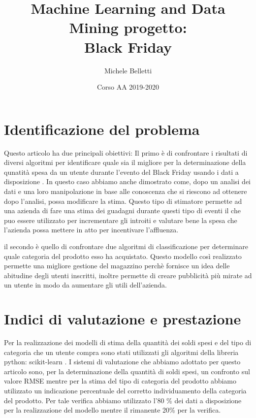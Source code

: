 \documentclass{article}
\title{Machine Learning and Data Mining progetto:\\Black Friday}
\author{Michele Belletti}
\date{Corso AA 2019-2020}
\begin{document}
\maketitle



\section{Identificazione del problema}
Questo articolo ha due principali obiettivi:
Il primo è di confrontare  i risultati di diversi algoritmi per identificare quale sia il migliore per la determinazione della qunatità spesa da un utente durante l'evento del Black Friday usando i dati a disposizione \cite{data} . In questo caso abbiamo anche dimostrato come, dopo un analisi dei dati e una loro manipolazione in base alle conoscenza che si riescono ad ottenere dopo l'analisi, possa modificare la stima.
Questo tipo di stimatore permette ad una azienda di fare una stima dei guadagni durante questi tipo di eventi il che puo essere utilizzato per incrementare gli introiti e valutare bene la spesa che l'azienda possa mettere in atto per incentivare l'affluenza.

il secondo è quello di confrontare due algoritmi di classificazione per determinare quale categoria del prodotto esso ha acquistato. Questo modello così realizzato permette una migliore gestione del magazzino perchè fornisce un idea delle abitudine degli utenti inscritti, inoltre permette di creare pubblicità più mirate ad un utente in modo da aumentare gli utili dell'azienda. 


\section{Indici di valutazione e prestazione}
Per la realizzazione dei modelli di stima della quantità dei soldi spesi e del tipo di categoria che un utente compra sono stati utilizzati gli algoritmi della libreria python: scikit-learn \cite{scikit-learn} .
I sistemi di valutazione che abbiamo adottato per questo articolo sono, per la determinazione della quantità di soldi spesi, un confronto sul valore RMSE mentre per la stima del tipo di categoria del prodotto abbiamo utilizzato un indicazione percentuale del corretto individuamento della categoria del prodotto.
Per tale verifica abbiamo utilizzato l'80 \% dei dati a disposizione per la realizzazione del modello mentre il rimanente 20\% per la verifica.
\end{document}
